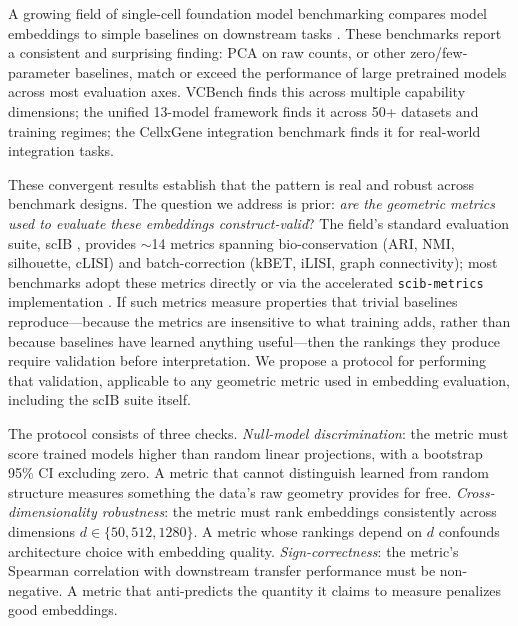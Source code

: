 \documentclass[10pt,letterpaper]{article}
\begin{document}
A growing field of single-cell foundation model benchmarking compares model embeddings to simple baselines on downstream tasks \citep{luecken2022scib, wu2025scfm, vcbench2026, unifiedscfm2026, cellxgeneintegration2026}. These benchmarks report a consistent and surprising finding: PCA on raw counts, or other zero/few-parameter baselines, match or exceed the performance of large pretrained models across most evaluation axes. VCBench \citep{vcbench2026} finds this across multiple capability dimensions; the unified 13-model framework \citep{unifiedscfm2026} finds it across 50+ datasets and training regimes; the CellxGene integration benchmark \citep{cellxgeneintegration2026} finds it for real-world integration tasks.

These convergent results establish that the pattern is real and robust across benchmark designs. The question we address is prior: \emph{are the geometric metrics used to evaluate these embeddings construct-valid}? The field's standard evaluation suite, scIB \citep{luecken2022scib}, provides $\sim$14 metrics spanning bio-conservation (ARI, NMI, silhouette, cLISI) and batch-correction (kBET, iLISI, graph connectivity); most benchmarks adopt these metrics directly or via the accelerated \texttt{scib-metrics} implementation \citep{scibmetrics2023}. If such metrics measure properties that trivial baselines reproduce---because the metrics are insensitive to what training adds, rather than because baselines have learned anything useful---then the rankings they produce require validation before interpretation. We propose a protocol for performing that validation, applicable to any geometric metric used in embedding evaluation, including the scIB suite itself.

The protocol consists of three checks. \emph{Null-model discrimination}: the metric must score trained models higher than random linear projections, with a bootstrap 95\% CI excluding zero. A metric that cannot distinguish learned from random structure measures something the data's raw geometry provides for free. \emph{Cross-dimensionality robustness}: the metric must rank embeddings consistently across dimensions $d \in \{50, 512, 1280\}$. A metric whose rankings depend on $d$ confounds architecture choice with embedding quality. \emph{Sign-correctness}: the metric's Spearman correlation with downstream transfer performance must be non-negative. A metric that anti-predicts the quantity it claims to measure penalizes good embeddings.
\end{document}
